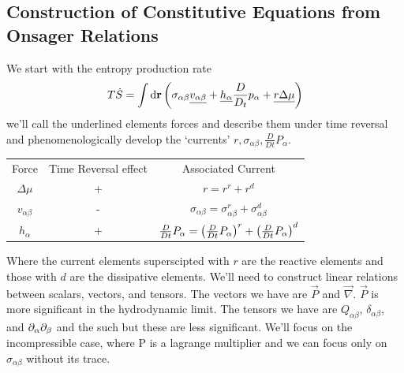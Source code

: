 \subsection{Construction of Constitutive Equations from Onsager Relations}
We start with the entropy production rate
\begin{equation}
    T\dot{S} = \int \mathop{}\!\mathrm{d}\mathbf{r} \left(\sigma_{\alpha\beta} \underline{v_{\alpha\beta}} +\underline{h_\alpha} \frac{D}{D_t}p_\alpha + \underline{r\Delta\mu}\right)
\end{equation}
we'll call the underlined elements forces and describe them under time reversal and phenomenologically develop the `currents' \(r, \sigma_{\alpha\beta},\frac{D}{Dt}P_\alpha\).

\begin{table}[!htb]
    \centering
    \begin{tabular}{ccc}
        Force & Time Reversal effect & Associated Current \\
        \(\Delta \mu\) & + & \(r=r^r+r^d\) \\
        \(v_{\alpha\beta}\) & - & \(\sigma_{\alpha\beta} = \sigma_{\alpha\beta}^r+\sigma_{\alpha\beta}^d\) \\
        \(h_\alpha\) & + & \(\frac{D}{Dt}P_\alpha = \left(\frac{D}{Dt}P_\alpha\right)^r+\left(\frac{D}{Dt}P_\alpha\right)^d\)
    \end{tabular}
\end{table}

Where the current elements superscipted with \(r\) are the reactive elements and those with \(d\) are the dissipative elements. We'll need to construct linear relations between scalars, vectors, and tensors. The vectors we have are \(\vec{P}\) and \(\vec{\nabla}\). \(\vec{P}\) is more significant in the hydrodynamic limit. The tensors we have are \(Q_{\alpha\beta}\), \(\delta_{\alpha\beta}\), and \(\partial_\alpha \partial_\beta\) and the such but these are less significant. We'll focus on the incompressible case, where P is a lagrange multiplier and we can focus only on \(\sigma_{\alpha\beta}\) without its trace.
